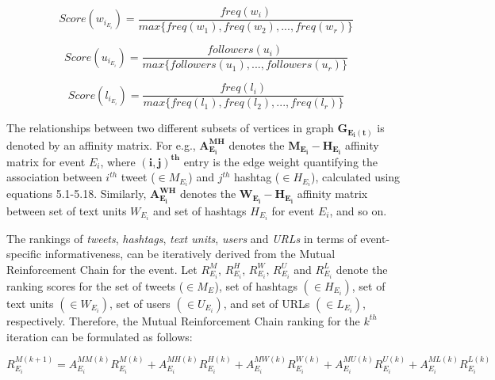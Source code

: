 \begin{equation}
Score(w_{i_{E_{i}}}) = \frac{freq(w_{i})}{max\{freq(w_{1}),freq(w_{2}),...,freq(w_{r})\}}
\end{equation}

\begin{equation}
Score(u_{i_{E_{i}}}) = \frac{followers(u_{i})}{max\{followers(u_{1}),...,followers(u_{r})\}}
\end{equation}

\begin{equation}
Score(l_{i_{E_{i}}}) = \frac{freq(l_{i})}{max\{freq(l_{1}),freq(l_{2}),...,freq(l_{r})\}}
\end{equation}


The relationships between two different subsets of vertices in graph $\mathbf{G_{E_{i}(t)}}$ is denoted by an affinity matrix. For e.g., $\mathbf{A_{E_{i}}^{MH}}$ denotes the $\mathbf{M_{E_{i}}-H_{E_{i}}}$ affinity matrix for event $E_{i}$, where $\mathbf{(i,j)^{th}}$ entry is the edge weight quantifying the association between $i^{th}$ tweet ($\in M_{E_{i}}$) and $j^{th}$ hashtag ($\in H_{E_{i}}$), calculated using equations 5.1-5.18. Similarly, $\mathbf{A_{E_{i}}^{WH}}$ denotes the $\mathbf{W_{E_{i}}-H_{E_{i}}}$ affinity matrix between set of text units $W_{E_{i}}$ and set of hashtags $H_{E_{i}}$ for event $E_{i}$, and so on.


The rankings of \textit{tweets}, \textit{hashtags}, \textit{text units}, \textit{users} and \textit{URLs} in terms of event-specific informativeness, can be iteratively derived from the Mutual Reinforcement Chain for the event. Let $R_{{E_{i}}}^{M}$, $R_{{E_{i}}}^{H}$, $R_{{E_{i}}}^{W}$, $R_{{E_{i}}}^{U}$ and $R_{{E_{i}}}^{L}$ denote the ranking scores for the set of tweets ($\in M_{E_{}}$), set of  hashtags $(\in H_{E_{i}})$, set of text units $(\in W_{E_{i}})$, set of users $(\in U_{E_{i}})$, and set of URLs $(\in L_{E_{i}})$, respectively. Therefore, the Mutual Reinforcement Chain ranking for the $k^{th}$ iteration can be formulated as follows:
 


\begin{equation}
R_{{E_{i}}}^{M(k+1)} = A_{E_{i}}^{MM(k)}R_{{E_{i}}}^{M(k)} + A_{E_{i}}^{MH(k)}R_{{E_{i}}}^{H(k)} + A_{E_{i}}^{MW(k)}R_{{E_{i}}}^{W(k)}+ A_{E_{i}}^{MU(k)}R_{{E_{i}}}^{U(k)} + A_{E_{i}}^{ML(k)}R_{{E_{i}}}^{L(k)}
\end{equation}

